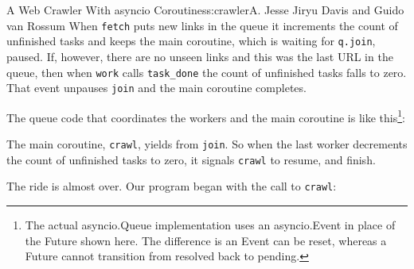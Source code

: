 \begin{aosachapter}{A Web Crawler With asyncio Coroutines}{s:crawler}{A. Jesse Jiryu Davis and Guido van Rossum}
When \texttt{fetch} puts new links in the queue it increments the count
of unfinished tasks and keeps the main coroutine, which is waiting for
\texttt{q.join}, paused. If, however, there are no unseen links and this
was the last URL in the queue, then when \texttt{work} calls
\texttt{task\_done} the count of unfinished tasks falls to zero. That
event unpauses \texttt{join} and the main coroutine completes.

The queue code that coordinates the workers and the main coroutine is
like this\footnote{The actual asyncio.Queue implementation uses an
  asyncio.Event in place of the Future shown here. The difference is an
  Event can be reset, whereas a Future cannot transition from resolved
  back to pending.}:

\begin{Shaded}
\begin{Highlighting}[]
 
     \NormalTok{(}\NormalTok{):}
    
     

     \NormalTok{):}
         \NormalTok{:}
            \NormalTok{)}

     \NormalTok{):}
         \NormalTok{:}
              
\end{Highlighting}
\end{Shaded}

The main coroutine, \texttt{crawl}, yields from \texttt{join}. So when
the last worker decrements the count of unfinished tasks to zero, it
signals \texttt{crawl} to resume, and finish.

The ride is almost over. Our program began with the call to
\texttt{crawl}:


\end{aosachapter}

